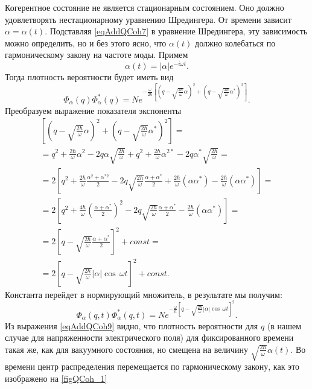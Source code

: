 Когерентное состояние не является стационарным состоянием. Оно должно
удовлетворять нестационарному уравнению Шредингера. От времени зависит
$\alpha = \alpha\left(t\right)$. Подставляя \eqref{eqAddQCoh7} в
уравнение Шредингера, эту зависимость можно определить, но и без этого
ясно, что $\alpha\left(t\right)$ должно колебаться по гармоническому
закону на частоте моды. Примем 
\[
\alpha\left(t\right) = \left|\alpha\right| e^{-i \omega t}.
\]
Тогда плотность вероятности будет иметь вид
\begin{equation}
\Phi_{\alpha}\left(q\right)\Phi_{\alpha}^{*}\left(q\right) = N e^{-\frac{\omega}{2
    \hbar}
\left[\left(q-\sqrt{\frac{2\hbar}{\omega}}\alpha\right)^2
+
\left(q-\sqrt{\frac{2\hbar}{\omega}}\alpha^{*}\right)^2
\right]
}.
\nonumber
\end{equation}
Преобразуем выражение показателя экспоненты
\begin{eqnarray}
\left[\left(q-\sqrt{\frac{2\hbar}{\omega}}\alpha\right)^2
+
\left(q-\sqrt{\frac{2\hbar}{\omega}}\alpha^{*}\right)^2
\right] = 
\nonumber \\
=
q^2 + \frac{2\hbar}{\omega}\alpha^2 - 2 q \alpha
  \sqrt{\frac{2\hbar}{\omega}} +
q^2 + \frac{2\hbar}{\omega}\alpha^{2 *} - 2 q \alpha^{*}
  \sqrt{\frac{2\hbar}{\omega}} =
\nonumber \\
= 2
\left[
q^2 + \frac{2\hbar}{\omega}\frac{\alpha^2 + \alpha^{*2}}{2} -
2 q \sqrt{\frac{2\hbar}{\omega}} \frac{\alpha + \alpha^{*}}{2} +
\frac{2 \hbar}{\omega}\left(\alpha\alpha^{*}\right) -
\frac{2 \hbar}{\omega}\left(\alpha\alpha^{*}\right)
\right] = 
\nonumber \\
= 2
\left[
q^2 + \frac{4\hbar}{\omega}\left(\frac{\alpha + \alpha^{*}}{2}\right)^2 -
2 q \sqrt{\frac{2\hbar}{\omega}} \frac{\alpha + \alpha^{*}}{2}  -
\frac{2 \hbar}{\omega}\left(\alpha\alpha^{*}\right)
\right] = 
\nonumber \\
= 2
\left[
q - \sqrt{\frac{2\hbar}{\omega}} \frac{\alpha + \alpha^{*}}{2}
\right]^2 + const = 
\nonumber \\
= 
2
\left[
q - \sqrt{\frac{2\hbar}{\omega}} \left|\alpha\right|\cos\,\omega t
\right]^2 + const.
\nonumber
\end{eqnarray}
Константа перейдет в нормирующий множитель, в результате мы получим:
\begin{equation}
\Phi_{\alpha}\left(q,t\right)\Phi_{\alpha}^{*}\left(q,t\right) = N
e^{-\frac{\omega}{\hbar}
\left[
q - \sqrt{\frac{2\hbar}{\omega}} \left|\alpha\right|\cos\,\omega t
\right]^2
}.
\label{eqAddQCoh9}
\end{equation}
Из выражения \eqref{eqAddQCoh9} видно, что плотность вероятности для
$q$ (в нашем случае для напряженности электрического поля) для
фиксированного времени такая же, как для вакуумного состояния, но
смещена на величину
$\sqrt{\frac{2\hbar}{\omega}}\alpha\left(t\right)$. Во времени центр
распределения перемещается по гармоническому закону, как это
изображено на \autoref{figQCoh_1} 

